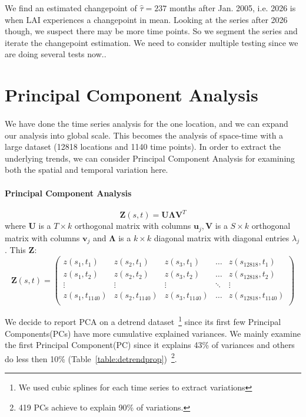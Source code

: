 \documentclass[11pt]{article}
\begin{document}
We find an estimated changepoint of $\hat{\tau}= 237$ months after Jan. 2005, i.e. 2026 is when LAI experiences a changepoint in mean. Looking at the series after 2026 though, we suspect there may be more time points. So we segment the series and iterate the changepoint estimation. We need to consider multiple testing since we are doing several tests now..



\section{Principal Component Analysis}
\paragraph{} 
We have done the time series analysis for the one location, and we can expand our analysis into global scale. This becomes the analysis of space-time with a large dataset (12818 locations and 1140 time points). In order to extract the underlying trends, we can consider Principal Component Analysis for examining both the spatial and temporal variation here. 

\paragraph{Principal Component Analysis}
\begin{equation}
\mathbf{Z}(s,t) = \mathbf{U}\mathbf{\Lambda}\mathbf{V}^T
\end{equation}
where $\mathbf{U}$ is a $T \times k$ orthogonal matrix with columns $\mathbf{u}_j, \mathbf{V}$ is a $S \times k$ orthogonal matrix with columns $\mathbf{v}_j$ and $\mathbf{\Lambda}$ is a $k \times k$ diagonal matrix with diagonal entries $\lambda_j$. This $\mathbf{Z}$: 
\begin{equation}
\mathbf{Z}(s,t)  = \begin{pmatrix}
z(s_1, t_1) & z(s_2, t_1) & z(s_3, t_1) & \dots & z(s_{12818}, t_1) \\
z(s_1, t_2) & z(s_2, t_2) & z(s_3, t_2) & \dots & z(s_{12818}, t_2) \\
\vdots & \vdots & \vdots & \ddots & \vdots\\
z(s_1, t_{1140}) & z(s_2, t_{1140}) & z(s_3, t_{1140}) & \dots & z(s_{12818}, t_{1140})\\ 
\end{pmatrix}
\end{equation}

We decide to report PCA on a detrend dataset~\footnote{We used cubic splines for each time series to extract variations} since its first few Principal Components(PCs) have more cumulative explained variances. We mainly examine the first Principal Component(PC) since it explains 43\% of variances and others do less then 10\% (Table~\ref{table:detrendprop})~\footnote{419 PCs achieve to explain 90\% of variations.}.
\end{document}
